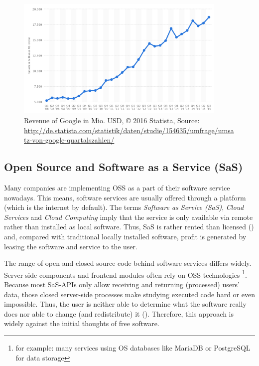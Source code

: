 \begin{figure}[!ht]
	\centering
	\includegraphics[width=0.9\textwidth]{../graphics/images/google_revenue.png}
	\caption{Revenue of Google in Mio. USD, © 2016 Statista, Source: \url{http://de.statista.com/statistik/daten/studie/154635/umfrage/umsatz-von-google-quartalszahlen/}
}
\end{figure}

\subsection{Open Source and Software as a Service (SaS)}
\label{sec:sas}

Many companies are implementing OSS as a part of their software service nowadays. This means, software services are usually offered through a platform (which is the internet by default). The terms \textit{Software as Service (SaS)}, \textit{Cloud Services} and \textit{Cloud Computing} imply that the service is only available via remote rather than installed as local software. Thus, SaS is rather rented than licensed (\cite{buxmann2008software}) and, compared with traditional locally installed software, profit is generated by leasing the software and service to the user.

The range of open and closed source code behind software services differs widely. Server side components and frontend modules often rely on OSS technologies \footnote{for example: many services using OS databases like MariaDB or PostgreSQL for data storage}. Because most SaS-APIs only allow receiving and returning (processed) users' data, those closed server-side processes make studying executed code hard or even impossible. Thus, the user is neither able to determine what the software really does nor able to change (and redistribute) it (\cite{WhatDoesThatServerReallyServe:online}). Therefore, this approach is widely against the initial thoughts of free software.

